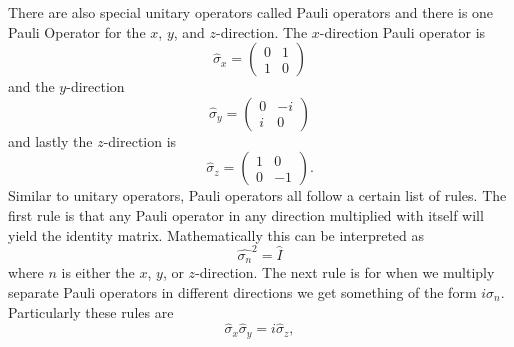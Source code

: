 \documentclass[twocolumn]{article}
\begin{document}
There are also special unitary operators called Pauli operators and there is one Pauli Operator for the $x$, $y$, and $z$-direction. The $x$-direction Pauli operator is
\begin{equation}\label{eq:15}
\hat{\sigma}_x=
\begin{pmatrix}
0 & 1 \\
1 & 0
\end{pmatrix}
\end{equation}
and the $y$-direction
\begin{equation}\label{eq:16}
\hat{\sigma}_y=
\begin{pmatrix}
0 & -i \\
i & 0
\end{pmatrix}
\end{equation}
and lastly the $z$-direction is
\begin{equation}\label{eq:17}
\hat{\sigma}_z=
\begin{pmatrix}
1 & 0 \\
0 & -1
\end{pmatrix}.
\end{equation}
Similar to unitary operators, Pauli operators all follow a certain list of rules. The first rule is that any Pauli operator in any direction multiplied with itself will yield the identity matrix. Mathematically this can be interpreted as
\begin{equation}\label{eq:18}
\hat{\sigma_n}^2=\hat{I}
\end{equation}
where $n$ is either the $x$, $y$, or $z$-direction. The next rule is for when we multiply separate Pauli operators in different directions we get something of the form $i\sigma_n$. Particularly these rules are
\begin{equation}\label{eq:19}
\hat{\sigma}_x\hat{\sigma}_y=i\hat{\sigma}_z,
\end{equation}
\end{document}
